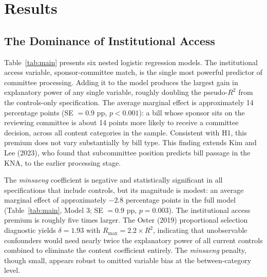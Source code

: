 \documentclass[11pt]{article}
\begin{document}
\section{Results}\label{sec:results}

\subsection{The Dominance of Institutional Access}\label{sec:access}

Table~\ref{tab:main} presents six nested logistic regression models. The institutional access variable, sponsor-committee match, is the single most powerful predictor of committee processing. Adding it to the model produces the largest gain in explanatory power of any single variable, roughly doubling the pseudo-$R^2$ from the controls-only specification. The average marginal effect is approximately 14 percentage points (SE $= 0.9$ pp, $p < 0.001$): a bill whose sponsor sits on the reviewing committee is about 14 points more likely to receive a committee decision, across all content categories in the sample. Consistent with H1, this premium does not vary substantially by bill type. This finding extends Kim and Lee (2023), who found that subcommittee position predicts bill passage in the KNA, to the earlier processing stage.

The \emph{minsaeng} coefficient is negative and statistically significant in all specifications that include controls, but its magnitude is modest: an average marginal effect of approximately $-2.8$ percentage points in the full model (Table~\ref{tab:main}, Model 3; SE $= 0.9$ pp, $p = 0.003$). The institutional access premium is roughly five times larger. The Oster (2019) proportional selection diagnostic yields $\delta = 1.93$ with $R_{\max} = 2.2 \times R^2$, indicating that unobservable confounders would need nearly twice the explanatory power of all current controls combined to eliminate the content coefficient entirely. The \emph{minsaeng} penalty, though small, appears robust to omitted variable bias at the between-category level.
\end{document}
